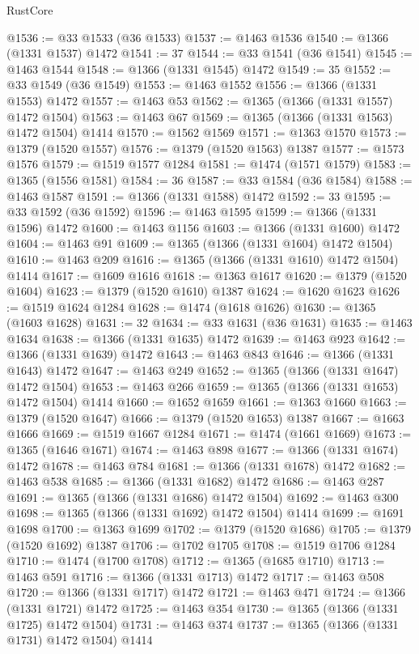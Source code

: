 \begin{lexlean}{RustCore}
\begin{coremodule}
@1536 := @33 @1533 (@36 @1533)
@1537 := @1463 @1536
@1540 := @1366 (@1331 @1537) @1472
@1541 := 37
@1544 := @33 @1541 (@36 @1541)
@1545 := @1463 @1544
@1548 := @1366 (@1331 @1545) @1472
@1549 := 35
@1552 := @33 @1549 (@36 @1549)
@1553 := @1463 @1552
@1556 := @1366 (@1331 @1553) @1472
@1557 := @1463 @53
@1562 := @1365 (@1366 (@1331 @1557) @1472 @1504)
@1563 := @1463 @67
@1569 := @1365 (@1366 (@1331 @1563) @1472 @1504) @1414
@1570 := @1562 @1569
@1571 := @1363 @1570
@1573 := @1379 (@1520 @1557)
@1576 := @1379 (@1520 @1563) @1387
@1577 := @1573 @1576
@1579 := @1519 @1577 @1284
@1581 := @1474 (@1571 @1579)
@1583 := @1365 (@1556 @1581)
@1584 := 36
@1587 := @33 @1584 (@36 @1584)
@1588 := @1463 @1587
@1591 := @1366 (@1331 @1588) @1472
@1592 := 33
@1595 := @33 @1592 (@36 @1592)
@1596 := @1463 @1595
@1599 := @1366 (@1331 @1596) @1472
@1600 := @1463 @1156
@1603 := @1366 (@1331 @1600) @1472
@1604 := @1463 @91
@1609 := @1365 (@1366 (@1331 @1604) @1472 @1504)
@1610 := @1463 @209
@1616 := @1365 (@1366 (@1331 @1610) @1472 @1504) @1414
@1617 := @1609 @1616
@1618 := @1363 @1617
@1620 := @1379 (@1520 @1604)
@1623 := @1379 (@1520 @1610) @1387
@1624 := @1620 @1623
@1626 := @1519 @1624 @1284
@1628 := @1474 (@1618 @1626)
@1630 := @1365 (@1603 @1628)
@1631 := 32
@1634 := @33 @1631 (@36 @1631)
@1635 := @1463 @1634
@1638 := @1366 (@1331 @1635) @1472
@1639 := @1463 @923
@1642 := @1366 (@1331 @1639) @1472
@1643 := @1463 @843
@1646 := @1366 (@1331 @1643) @1472
@1647 := @1463 @249
@1652 := @1365 (@1366 (@1331 @1647) @1472 @1504)
@1653 := @1463 @266
@1659 := @1365 (@1366 (@1331 @1653) @1472 @1504) @1414
@1660 := @1652 @1659
@1661 := @1363 @1660
@1663 := @1379 (@1520 @1647)
@1666 := @1379 (@1520 @1653) @1387
@1667 := @1663 @1666
@1669 := @1519 @1667 @1284
@1671 := @1474 (@1661 @1669)
@1673 := @1365 (@1646 @1671)
@1674 := @1463 @898
@1677 := @1366 (@1331 @1674) @1472
@1678 := @1463 @784
@1681 := @1366 (@1331 @1678) @1472
@1682 := @1463 @538
@1685 := @1366 (@1331 @1682) @1472
@1686 := @1463 @287
@1691 := @1365 (@1366 (@1331 @1686) @1472 @1504)
@1692 := @1463 @300
@1698 := @1365 (@1366 (@1331 @1692) @1472 @1504) @1414
@1699 := @1691 @1698
@1700 := @1363 @1699
@1702 := @1379 (@1520 @1686)
@1705 := @1379 (@1520 @1692) @1387
@1706 := @1702 @1705
@1708 := @1519 @1706 @1284
@1710 := @1474 (@1700 @1708)
@1712 := @1365 (@1685 @1710)
@1713 := @1463 @591
@1716 := @1366 (@1331 @1713) @1472
@1717 := @1463 @508
@1720 := @1366 (@1331 @1717) @1472
@1721 := @1463 @471
@1724 := @1366 (@1331 @1721) @1472
@1725 := @1463 @354
@1730 := @1365 (@1366 (@1331 @1725) @1472 @1504)
@1731 := @1463 @374
@1737 := @1365 (@1366 (@1331 @1731) @1472 @1504) @1414

\end{coremodule}
\end{lexlean}

